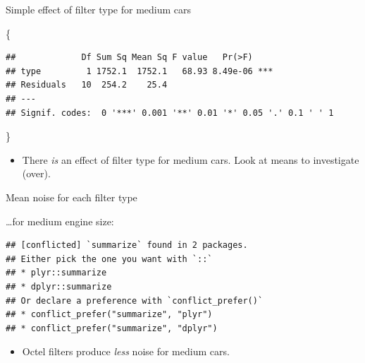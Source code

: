 \documentclass[ignorenonframetext,]{beamer}
\newenvironment{Shaded}{\begin{snugshade}}{\end{snugshade}}
\newcommand{\DataTypeTok}[1]{\textcolor[rgb]{0.13,0.29,0.53}{#1}}
\newcommand{\KeywordTok}[1]{\textcolor[rgb]{0.13,0.29,0.53}{\textbf{#1}}}
\newcommand{\NormalTok}[1]{#1}
\newcommand{\OperatorTok}[1]{\textcolor[rgb]{0.81,0.36,0.00}{\textbf{#1}}}
\newcommand{\StringTok}[1]{\textcolor[rgb]{0.31,0.60,0.02}{#1}}
\providecommand{\tightlist}{%
  \setlength{\itemsep}{0pt}\setlength{\parskip}{0pt}}
\begin{document}
\begin{frame}[fragile]{Simple effect of filter type for medium cars}
\protect\hypertarget{simple-effect-of-filter-type-for-medium-cars}{}

\{\small

\begin{Shaded}
\end{Shaded}

\begin{verbatim}
##             Df Sum Sq Mean Sq F value   Pr(>F)    
## type         1 1752.1  1752.1   68.93 8.49e-06 ***
## Residuals   10  254.2    25.4                     
## ---
## Signif. codes:  0 '***' 0.001 '**' 0.01 '*' 0.05 '.' 0.1 ' ' 1
\end{verbatim}

\}

\begin{itemize}
\tightlist
\item
  There \emph{is} an effect of filter type for medium cars. Look at
  means to investigate (over).
\end{itemize}

\end{frame}

\begin{frame}[fragile]{Mean noise for each filter type}
\protect\hypertarget{mean-noise-for-each-filter-type}{}

\ldots for medium engine size:

\begin{Shaded}
\end{Shaded}

\begin{verbatim}
## [conflicted] `summarize` found in 2 packages.
## Either pick the one you want with `::` 
## * plyr::summarize
## * dplyr::summarize
## Or declare a preference with `conflict_prefer()`
## * conflict_prefer("summarize", "plyr")
## * conflict_prefer("summarize", "dplyr")
\end{verbatim}

\begin{itemize}
\tightlist
\item
  Octel filters produce \emph{less} noise for medium cars.
\end{itemize}

\end{frame}
\end{document}
